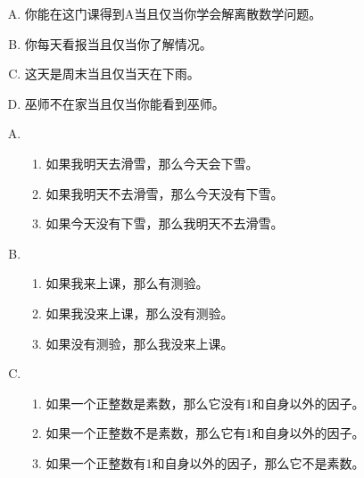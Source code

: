 {{        %
        \begin{practices}
            \begin{enumerate}[A.]
                \item 你能在这门课得到A当且仅当你学会解离散数学问题。
                \item 你每天看报当且仅当你了解情况。
                \item 这天是周末当且仅当天在下雨。
                \item 巫师不在家当且仅当你能看到巫师。
            \end{enumerate}
        \end{practices}

        \begin{practices}
            \begin{enumerate}[A.]
                \item
                {
                    \begin{enumerate}[1)]
                        \item 如果我明天去滑雪，那么今天会下雪。
                        \item 如果我明天不去滑雪，那么今天没有下雪。
                        \item 如果今天没有下雪，那么我明天不去滑雪。
                    \end{enumerate}
                }
                \item
                {
                    \begin{enumerate}[1)]
                        \item 如果我来上课，那么有测验。
                        \item 如果我没来上课，那么没有测验。
                        \item 如果没有测验，那么我没来上课。
                    \end{enumerate}
                }
                \item
                {
                    \begin{enumerate}[1)]
                        \item 如果一个正整数是素数，那么它没有1和自身以外的因子。
                        \item 如果一个正整数不是素数，那么它有1和自身以外的因子。
                        \item 如果一个正整数有1和自身以外的因子，那么它不是素数。
                    \end{enumerate}
                }
            \end{enumerate}
        \end{practices}

}}
